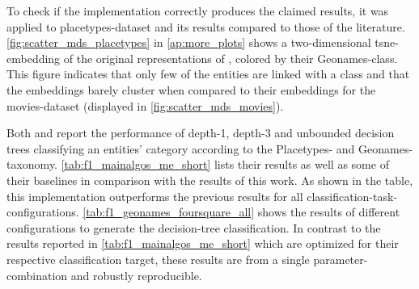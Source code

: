 To check if the implementation correctly produces the claimed results, it was applied to  placetypes-dataset and its results compared to those of the literature. \autoref{fig:scatter_mds_placetypes} in \autoref{ap:more_plots} shows a two-dimensional \gls{tsne}-embedding of the original representations of \cite{Derrac2015}, colored by their Geonames-class. This figure indicates that only few of the entities are linked with a class and that the embeddings barely cluster when compared to their embeddings for the movies-dataset (displayed in \autoref{fig:scatter_mds_movies}). 

Both \cite{Ager2018} and \cite{Alshaikh2020} report the performance of depth-1, depth-3 and unbounded decision trees classifying an entities' category according to the Placetypes- and Geonames-taxonomy. \autoref{tab:f1_mainalgos_me_short} lists their results as well as some of their baselines in comparison with the results of this work. As shown in the table, this implementation outperforms the previous results for all classification-task-configurations. \autoref{tab:f1_geonames_foursquare_all} shows the results of different configurations to generate the decision-tree classification. In contrast to the results reported in \autoref{tab:f1_mainalgos_me_short} which are optimized for their respective classification target, these results are from a single parameter-combination and robustly reproducible. 


